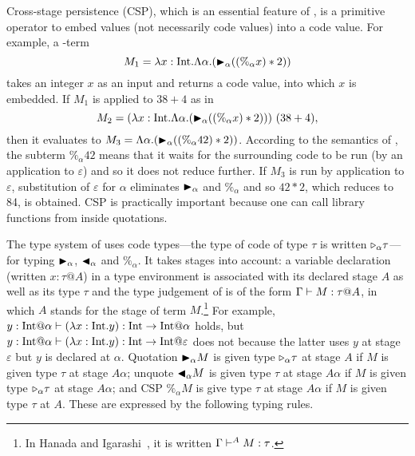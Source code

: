 
Cross-stage persistence (CSP), which is an essential feature of \LTP, is a
primitive operator to embed values (not necessarily code values) into a code
value. For example, a \LTP-term
\[
  M_1 = \lambda x:\textrm{Int}.\Lambda\alpha.({\mathop{\blacktriangleright}}_\alpha ((\%_\alpha x) * 2))
\]
takes an integer \(x\) as an input and returns a code value, into
which \(x\) is embedded.  If $M_1$ is applied to $38 + 4$ as in
\[
  M_2 = (\lambda x:\textrm{Int}.\Lambda\alpha.({\mathop{\blacktriangleright}}_\alpha ((\%_\alpha x) * 2)))\ (38 + 4),
\]
then it evaluates to \(M_3 = \Lambda\alpha.({\mathop{\blacktriangleright}}_\alpha ((\%_\alpha 42) * 2))\).
According to the semantics of \LTP, the subterm $\%_\alpha 42$ means that it
waits for the surrounding code to be run (by an application to $\varepsilon$)
and so it does not reduce further.  If \(M_3\) is run by application to
\(\varepsilon\), substitution of \(\varepsilon\) for \(\alpha\) eliminates
\({\mathop{\blacktriangleright}}_\alpha\) and \(\%_\alpha\) and so \(42 * 2\), which reduces to 84, is
obtained.  CSP is practically important because one can call library functions
from inside quotations.


The type system of \LTP uses code types---the type of code of type
\(\tau\) is written \({\mathop{\triangleright}}_\alpha \tau\)---for typing \({\mathop{\blacktriangleright}}_\alpha\),
\({\mathop{\blacktriangleleft}}_\alpha\) and \(\%_\alpha\).  It takes stages into account: a
variable declaration (written $x:\tau@A$) in a type environment is associated with its
declared stage $A$ as well as its type $\tau$ and the type judgement of \LTP is of
the form $\G \vdash M : \tau@A$, in which $A$ stands for the stage
of term $M$.\footnote{%
  In Hanada and Igarashi~\cite{Hanada2014}, it is written
  $\Gamma \vdash^A M : \tau$.
  }
For example,
$y:\I@\alpha \vdash (\lambda x:\I.y) : \I \to \I @ \alpha$ holds, but
$y:\I@\alpha \vdash (\lambda x:\I.y) : \I \to \I @ \varepsilon$ does
not because the latter uses $y$ at stage \(\varepsilon\) but $y$ is
declared at $\alpha$.  Quotation \({\mathop{\blacktriangleright}}_\alpha M\) is given type
\({\mathop{\triangleright}}_\alpha \tau\) at stage \(A\) if \(M\) is given type \(\tau\) at
stage \(A\alpha\); unquote \({\mathop{\blacktriangleleft}}_\alpha M\) is given type \(\tau\)
at stage \(A\alpha\) if \(M\) is given type \({\mathop{\triangleright}}_\alpha \tau\) at
stage \(A\alpha\); and CSP \(\%_\alpha M\) is give type \(\tau\)
at stage \(A\alpha\) if \(M\) is given type \(\tau\) at \(A\).
These are expressed by the following typing rules.
\begin{center}
	 \hfil
	 \hfil
\end{center}

